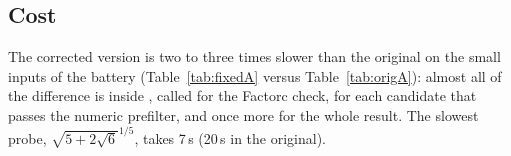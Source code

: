 \subsection{Cost}
The corrected version is two to three times slower than the original on the
small inputs of the battery (Table~\ref{tab:fixedA} versus
Table~\ref{tab:origA}): almost all of the difference is 
inside , called for the Factorc check, for each
candidate that passes the numeric prefilter, and once more for the whole
result. The slowest probe, $\sqrt{5+2\sqrt6}^{1/5}$, takes 7\,s (20\,s in the original).
